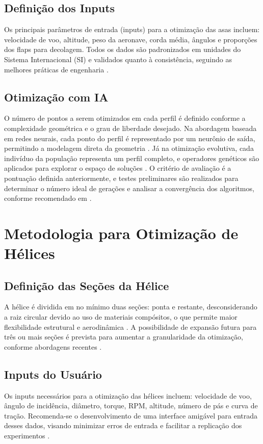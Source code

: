 \subsection{Definição dos Inputs}
Os principais parâmetros de entrada (inputs) para a otimização das asas incluem: velocidade de voo, altitude, peso da aeronave, corda média, ângulos e proporções dos flaps para decolagem. Todos os dados são padronizados em unidades do Sistema Internacional (SI) e validados quanto à consistência, seguindo as melhores práticas de engenharia \cite{anderson2017fundamentals, raymer2018aircraft}.

\subsection{Otimização com IA}
O número de pontos a serem otimizados em cada perfil é definido conforme a complexidade geométrica e o grau de liberdade desejado. Na abordagem baseada em redes neurais, cada ponto do perfil é representado por um neurônio de saída, permitindo a modelagem direta da geometria \cite{wu2024, goodfellow2016deep}. Já na otimização evolutiva, cada indivíduo da população representa um perfil completo, e operadores genéticos são aplicados para explorar o espaço de soluções \cite{goldberg1989genetic, back1996evolutionary, oliveira2023}. O critério de avaliação é a pontuação definida anteriormente, e testes preliminares são realizados para determinar o número ideal de gerações e analisar a convergência dos algoritmos, conforme recomendado em \cite{hasan2024, wu2024}.

\section{Metodologia para Otimização de Hélices}

\subsection{Definição das Seções da Hélice}
A hélice é dividida em no mínimo duas seções: ponta e restante, desconsiderando a raiz circular devido ao uso de materiais compósitos, o que permite maior flexibilidade estrutural e aerodinâmica \cite{raymer2018aircraft}. A possibilidade de expansão futura para três ou mais seções é prevista para aumentar a granularidade da otimização, conforme abordagens recentes \cite{wu2024}.

\subsection{Inputs do Usuário}
Os inputs necessários para a otimização  das hélices incluem: velocidade de voo, ângulo de incidência, diâmetro, torque, RPM, altitude, número de pás e curva de tração. Recomenda-se o desenvolvimento de uma interface amigável para entrada desses dados, visando minimizar erros de entrada e facilitar a replicação dos experimentos \cite{wu2024, raymer2018aircraft}.


